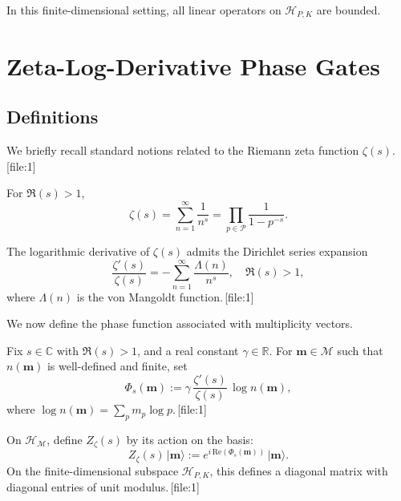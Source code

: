 \documentclass[11pt]{article}
\begin{document}
In this finite-dimensional setting, all linear operators on \(\mathcal{H}_{P,K}\) are bounded.

\section{Zeta-Log-Derivative Phase Gates}

\subsection{Definitions}

We briefly recall standard notions related to the Riemann zeta function \(\zeta(s)\).\,[file:1]

\begin{definition}
For \(\Re(s) > 1\),
\begin{equation}
    \zeta(s) = \sum_{n=1}^{\infty} \frac{1}{n^s} = \prod_{p \in \mathcal{P}} \frac{1}{1 - p^{-s}}.
\end{equation}
\end{definition}

The logarithmic derivative of \(\zeta(s)\) admits the Dirichlet series expansion
\begin{equation}
    \frac{\zeta'(s)}{\zeta(s)} = - \sum_{n=1}^{\infty} \frac{\Lambda(n)}{n^s}, \quad \Re(s) > 1,
\end{equation}
where \(\Lambda(n)\) is the von Mangoldt function.\,[file:1]

We now define the phase function associated with multiplicity vectors.

\begin{definition}
Fix \(s \in \mathbb{C}\) with \(\Re(s) > 1\), and a real constant \(\gamma \in \mathbb{R}\). For \(\mathbf{m} \in \mathcal{M}\) such that \(n(\mathbf{m})\) is well-defined and finite, set
\begin{equation}
    \Phi_s(\mathbf{m}) := \gamma\, \frac{\zeta'(s)}{\zeta(s)}\,\log n(\mathbf{m}),
\end{equation}
where \(\log n(\mathbf{m}) = \sum_{p} m_p \log p\).\,[file:1]
\end{definition}

\begin{definition}
On \(\mathcal{H}_{\mathcal{M}}\), define \(Z_\zeta(s)\) by its action on the basis:
\begin{equation}
    Z_\zeta(s)\,\lvert \mathbf{m} \rangle := e^{i\,\mathrm{Re}(\Phi_s(\mathbf{m}))}\,\lvert \mathbf{m} \rangle.
\end{equation}
On the finite-dimensional subspace \(\mathcal{H}_{P,K}\), this defines a diagonal matrix with diagonal entries of unit modulus.\,[file:1]
\end{definition}
\end{document}
